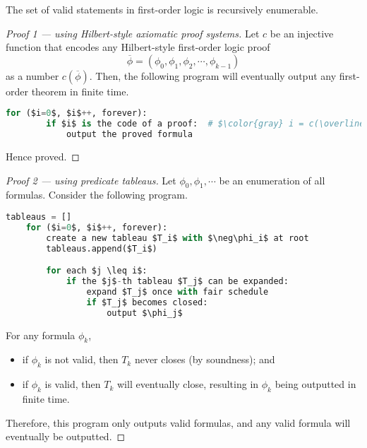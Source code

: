 \begin{theorem}
    The set of valid statements in first-order logic is recursively enumerable.
\end{theorem}
\begin{proof}[Proof 1 --- using Hilbert-style axiomatic proof systems]
    Let \(c\) be an injective function that encodes any Hilbert-style first-order logic proof \[\overline{\phi} = (\phi_0, \phi_1, \phi_2, \cdots, \phi_{k-1})\] as a number \(c(\overline{\phi})\). Then, the following program will eventually output any first-order theorem in finite time.
    \begin{lstlisting}[language=python, commentstyle=\color{gray}]
    for ($i=0$, $i$++, forever):
        if $i$ is the code of a proof:  # $\color{gray} i = c(\overline{\phi})$
            output the proved formula
    \end{lstlisting}
    Hence proved.
\end{proof}
\begin{proof}[Proof 2 --- using predicate tableaus]
    Let \(\phi_0, \phi_1, \cdots\) be an enumeration of all formulas. Consider the following program.
    \begin{lstlisting}[language=python, commentstyle=\color{gray}]
    tableaus = []
    for ($i=0$, $i$++, forever):
        create a new tableau $T_i$ with $\neg\phi_i$ at root
        tableaus.append($T_i$)

        for each $j \leq i$:
            if the $j$-th tableau $T_j$ can be expanded:
                expand $T_j$ once with fair schedule
                if $T_j$ becomes closed:
                    output $\phi_j$
    \end{lstlisting}
    For any formula \(\phi_k\),
    \begin{itemize}
        \item if \(\phi_k\) is not valid, then \(T_k\) never closes (by soundness); and
        \item if \(\phi_k\) is valid, then \(T_k\) will eventually close, resulting in \(\phi_k\) being outputted in finite time.
    \end{itemize}
    Therefore, this program only outputs valid formulas, and any valid formula will eventually be outputted.
\end{proof}

